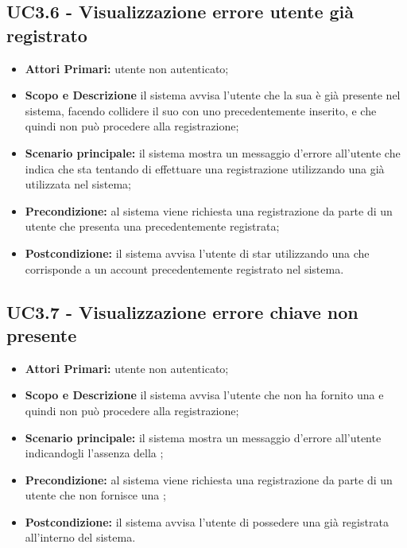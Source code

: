 \documentclass[AnalisiDeiRequisiti.tex]{subfiles}
\begin{document}
\subsection{UC3.6 - Visualizzazione errore utente già registrato}
\begin{itemize}
	\item \textbf{Attori Primari:} utente non autenticato;
	\item \textbf{Scopo e Descrizione} il sistema avvisa l'utente che la sua  è già presente nel sistema, facendo collidere il suo  con uno precedentemente inserito, e che quindi non può procedere alla registrazione;
	\item \textbf{Scenario principale:} il sistema mostra un messaggio d'errore all'utente che indica che sta tentando di effettuare una registrazione utilizzando una  già utilizzata nel sistema;
	\item \textbf{Precondizione:} al sistema viene richiesta una registrazione da parte di un utente che presenta una  precedentemente registrata;
	\item \textbf{Postcondizione:} il sistema avvisa l'utente di star utilizzando una  che corrisponde a un account precedentemente registrato nel sistema.
\end{itemize}
\subsection{UC3.7 - Visualizzazione errore chiave non presente}
\begin{itemize}
	\item \textbf{Attori Primari:} utente non autenticato;
	\item \textbf{Scopo e Descrizione} il sistema avvisa l'utente che non ha fornito una  e quindi non può procedere alla registrazione;
	\item \textbf{Scenario principale:} il sistema mostra un messaggio d'errore all'utente indicandogli l'assenza della ;
	\item \textbf{Precondizione:} al sistema viene richiesta una registrazione da parte di un utente che non fornisce una ;
	\item \textbf{Postcondizione:} il sistema avvisa l'utente di possedere una  già registrata all'interno del sistema.
\end{itemize}
\end{document}
